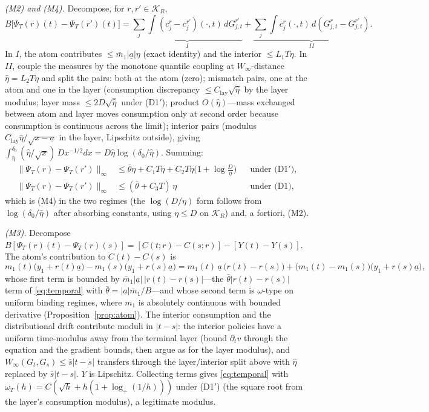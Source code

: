 \documentclass[11pt]{article}
\theoremstyle{definition}
\theoremstyle{remark}
\newcommand{\ubar}[1]{\underline{#1}}
\newcommand{\Kcal}{\mathcal{K}}
\newcommand{\dd}{\,d}
\newcommand{\uba}{\ubar{a}}
\newcommand{\psit}{\Psi_T}
\begin{document}
\emph{(M2) and (M4).} Decompose, for $r,r'\in\Kcal_R$,
\[
B\big[\psit(r)(t)-\psit(r')(t)\big]
=\underbrace{\sum_j\int(c^r_j-c^{r'}_j)(\cdot,t)\dd
G^{r'}_{j,t}}_{I}
+\underbrace{\sum_j\int c^r_j(\cdot,t)\dd(G^r_{j,t}
-G^{r'}_{j,t})}_{II}.
\]
In $I$, the atom contributes $\le\bar m_1|\uba|\eta$ (exact identity)
and the interior $\le L_1T\eta$. In $II$, couple the measures by the
monotone quantile coupling at $W_\infty$-distance
$\hat\eta=L_2T\eta$ and split the pairs: both at the atom (zero);
mismatch pairs, one at the atom and one in the layer (consumption
discrepancy $\le C_{\mathrm{lay}}\sqrt{\hat\eta}$ by the layer
modulus; layer mass $\le2D\sqrt{\hat\eta}$ under (D1$'$); product
$O(\hat\eta)$---mass exchanged between atom and layer moves
consumption only at second order because consumption is continuous
across the limit); interior pairs (modulus
$C_{\mathrm{lay}}\hat\eta/\sqrt{x-\uba}$ in the layer, Lipschitz
outside), giving
$\int_{\hat\eta}^{\delta_0}(\hat\eta/\sqrt x)\,Dx^{-1/2}dx
=D\hat\eta\log(\delta_0/\hat\eta)$. Summing:
\begin{align*}
\|\psit(r)-\psit(r')\|_\infty&\le
\bar\theta\eta+C_1T\eta+C_2T\eta\Big(1+\log\frac{D}{\eta}\Big)
&&\text{under (D1$'$)},\\
\|\psit(r)-\psit(r')\|_\infty&\le(\bar\theta+C_3T)\,\eta
&&\text{under (D1)},
\end{align*}
which is (M4) in the two regimes (the $\log(D/\eta)$ form follows
from $\log(\delta_0/\hat\eta)$ after absorbing constants, using
$\eta\le D$ on $\Kcal_R$) and, a fortiori, (M2).

\emph{(M3).} Decompose $B[\psit(r)(t)-\psit(r)(s)]
=[C(t;r)-C(s;r)]-[Y(t)-Y(s)]$. The atom's contribution to
$C(t)-C(s)$ is
\[
m_1(t)\big(y_1+r(t)\uba\big)-m_1(s)\big(y_1+r(s)\uba\big)
=m_1(t)\,\uba\,\big(r(t)-r(s)\big)
+\big(m_1(t)-m_1(s)\big)\big(y_1+r(s)\uba\big),
\]
whose first term is bounded by $\bar m_1|\uba|\,|r(t)-r(s)|$---the
$\bar\theta|r(t)-r(s)|$ term of \eqref{eq:temporal} with
$\bar\theta=|\uba|\bar m_1/B$---and whose second term is
$\omega$-type on uniform binding regimes, where $m_1$ is absolutely
continuous with bounded derivative
(Proposition~\ref{prop:atom}). The interior consumption and the
distributional drift contribute moduli in $|t-s|$: the interior
policies have a uniform time-modulus away from the terminal layer
(bound $\partial_tv$ through the equation and the gradient bounds,
then argue as for the layer modulus), and
$W_\infty(G_t,G_s)\le\bar s|t-s|$ transfers through the
layer/interior split above with $\hat\eta$ replaced by
$\bar s|t-s|$. $Y$ is Lipschitz. Collecting terms gives
\eqref{eq:temporal} with $\omega_T(h)=C(\sqrt h+h(1+\log_+(1/h)))$
under (D1$'$) (the square root from the layer's consumption modulus),
a legitimate modulus.
\end{document}
